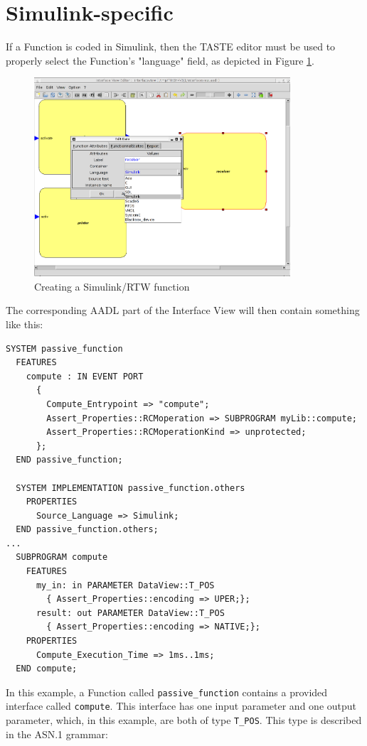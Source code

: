\documentclass[11pt]{book}
\begin{document}
   \section{Simulink-specific}
   If a Function is coded in Simulink, then the TASTE editor must be used to
   properly select the Function's "language" field, as depicted in Figure \ref{ellidiss1}.
\begin{figure}
\centering
\includegraphics[width=0.85\textwidth]{imgs/iv_simulink}
\caption{Creating a Simulink/RTW function}
\label{ellidiss1}
\end{figure}
   The corresponding AADL part of the Interface View will then contain something like this:
\begin{lstlisting}[language=aadl]
  SYSTEM passive_function
  FEATURES
    compute : IN EVENT PORT
      {
        Compute_Entrypoint => "compute";
        Assert_Properties::RCMoperation => SUBPROGRAM myLib::compute;
        Assert_Properties::RCMoperationKind => unprotected;
      };
  END passive_function;
  
  SYSTEM IMPLEMENTATION passive_function.others
    PROPERTIES
      Source_Language => Simulink;
  END passive_function.others;
...
  SUBPROGRAM compute
    FEATURES
      my_in: in PARAMETER DataView::T_POS
        { Assert_Properties::encoding => UPER;};
      result: out PARAMETER DataView::T_POS
        { Assert_Properties::encoding => NATIVE;};
    PROPERTIES
      Compute_Execution_Time => 1ms..1ms;
  END compute;
\end{lstlisting}
 
In this example, a Function called {\tt passive\_function} contains a provided interface
called {\tt compute}. This interface has one input parameter and one output parameter,
which, in this example, are both of type {\tt T\_POS}. This type is described in the 
ASN.1 grammar:
\end{document}
